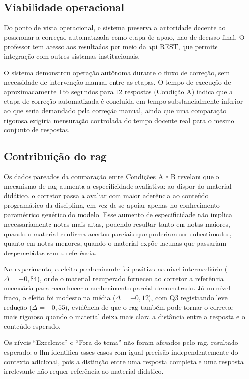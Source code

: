 \subsection{Viabilidade operacional}

Do ponto de vista operacional, o sistema preserva a autoridade docente ao posicionar a correção automatizada como etapa de apoio, não de decisão final. O professor tem acesso aos resultados por meio da \gls{api} REST, que permite integração com outros sistemas institucionais.

O sistema demonstrou operação autônoma durante o fluxo de correção, sem necessidade de intervenção manual entre as etapas. O tempo de execução de aproximadamente $155$ segundos para 12 respostas (Condição A) indica que a etapa de correção automatizada é concluída em tempo substancialmente inferior ao que seria demandado pela correção manual, ainda que uma comparação rigorosa exigiria mensuração controlada do tempo docente real para o mesmo conjunto de respostas.

\subsection{Contribuição do \texorpdfstring{\gls{rag}}{RAG}}

Os dados pareados da comparação entre Condições A e B revelam que o mecanismo de \gls{rag} aumenta a especificidade avaliativa: ao dispor do material didático, o corretor passa a avaliar com maior aderência ao conteúdo programático da disciplina, em vez de se apoiar apenas no conhecimento paramétrico genérico do modelo. Esse aumento de especificidade não implica necessariamente notas mais altas, podendo resultar tanto em notas maiores, quando o material confirma acertos parciais que poderiam ser subestimados, quanto em notas menores, quando o material expõe lacunas que passariam despercebidas sem a referência.

No experimento, o efeito predominante foi positivo no nível intermediário ($\Delta = +0{,}84$), onde o material recuperado forneceu ao corretor a referência necessária para reconhecer o conhecimento parcial demonstrado. Já no nível fraco, o efeito foi modesto na média ($\Delta = +0{,}12$), com Q3 registrando leve redução ($\Delta = -0{,}55$), evidência de que o \gls{rag} também pode tornar o corretor mais rigoroso quando o material deixa mais clara a distância entre a resposta e o conteúdo esperado.

Os níveis ``Excelente'' e ``Fora do tema'' não foram afetados pelo \gls{rag}, resultado esperado: o \gls{llm} identifica esses casos com igual precisão independentemente do contexto adicional, pois a distinção entre uma resposta completa e uma resposta irrelevante não requer referência ao material didático.

